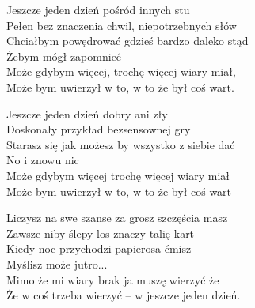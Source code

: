 \begin{text}
    Jeszcze jeden dzień pośród innych stu\\
    Pełen bez znaczenia chwil, niepotrzebnych słów\\
    Chciałbym powędrować gdzieś bardzo daleko stąd\\
    Żebym mógł zapomnieć\\
    Może gdybym więcej, trochę więcej wiary miał,\\
    Może bym uwierzył w to, w to że był coś wart.

    Jeszcze jeden dzień dobry ani zły\\
    Doskonały przykład bezsensownej gry\\
    Starasz się jak możesz by wszystko z siebie dać\\
    No i znowu nic\\
    Może gdybym więcej trochę więcej wiary miał\\
    Może bym uwierzył w to, w to że był coś wart

    Liczysz na swe szanse za grosz szczęścia masz\\
    Zawsze niby ślepy los znaczy talię kart\\
    Kiedy noc przychodzi papierosa ćmisz\\
    Myślisz może jutro...\\
    Mimo że mi wiary brak ja muszę wierzyć że\\
    Że w coś trzeba wierzyć – w jeszcze jeden dzień.
\end{text}
\begin{chord}

\end{chord}
